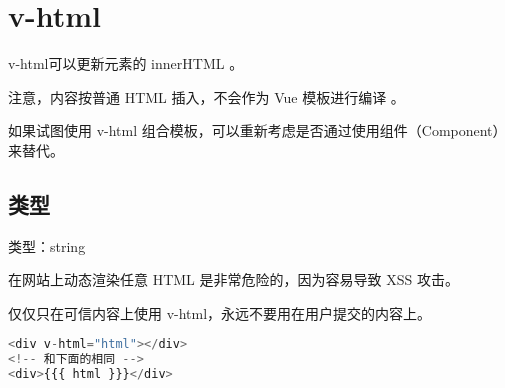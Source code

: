 \begin{lstlisting}[language=JavaScript]

\end{lstlisting}




\begin{lstlisting}[language=JavaScript]

\end{lstlisting}




\begin{lstlisting}[language=JavaScript]

\end{lstlisting}




\begin{lstlisting}[language=JavaScript]

\end{lstlisting}




\begin{lstlisting}[language=JavaScript]

\end{lstlisting}

\chapter{v-html}

v-html可以更新元素的 innerHTML 。

注意，内容按普通 HTML 插入，不会作为 Vue 模板进行编译 。

如果试图使用 v-html 组合模板，可以重新考虑是否通过使用组件（Component）来替代。

\section{类型}

\begin{compactitem}
\item 类型：string
\end{compactitem}

在网站上动态渲染任意 HTML 是非常危险的，因为容易导致 XSS 攻击。

仅仅只在可信内容上使用 v-html，永远不要用在用户提交的内容上。


\begin{lstlisting}[language=JavaScript]
<div v-html="html"></div>
<!-- 和下面的相同 -->
<div>{{{ html }}}</div>
\end{lstlisting}



